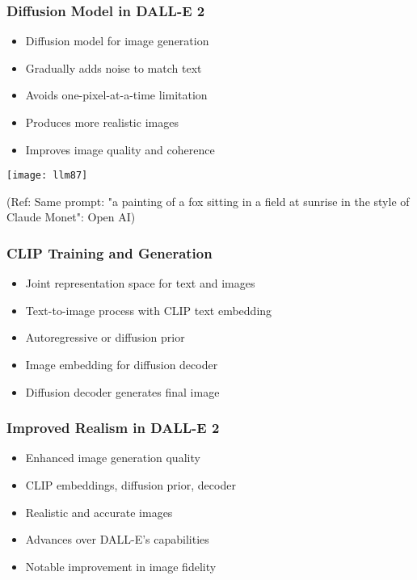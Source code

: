\begin{frame}[fragile]\frametitle{Diffusion Model in DALL-E 2}
    
    \begin{itemize}
        \item Diffusion model for image generation
        \item Gradually adds noise to match text
        \item Avoids one-pixel-at-a-time limitation
        \item Produces more realistic images
        \item Improves image quality and coherence
    \end{itemize}
	
\begin{center}
\texttt{[image: llm87]}
\end{center}		

{\tiny (Ref: Same prompt: "a painting of a fox sitting in a field at sunrise in the style of Claude Monet": Open AI)}
	
\end{frame}

\begin{frame}[fragile]\frametitle{CLIP Training and Generation}
    
    \begin{itemize}
        \item Joint representation space for text and images
        \item Text-to-image process with CLIP text embedding
        \item Autoregressive or diffusion prior
        \item Image embedding for diffusion decoder
        \item Diffusion decoder generates final image
    \end{itemize}
\end{frame}

\begin{frame}[fragile]\frametitle{Improved Realism in DALL-E 2}
    
    \begin{itemize}
        \item Enhanced image generation quality
        \item CLIP embeddings, diffusion prior, decoder
        \item Realistic and accurate images
        \item Advances over DALL-E's capabilities
        \item Notable improvement in image fidelity
    \end{itemize}
\end{frame}

